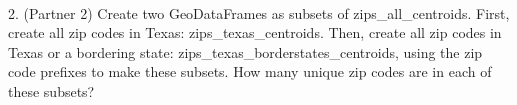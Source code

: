 \documentclass[
  letterpaper,
  DIV=11,
  numbers=noendperiod]{scrartcl}
\makeatletter
\let\oldparagraph\paragraph
\renewcommand{\paragraph}{
    \@ifstar
      \xxxParagraphStar
      \xxxParagraphNoStar
  }
\newcommand{\xxxParagraphStar}[1]{\oldparagraph*{#1}\mbox{}}
\newcommand{\xxxParagraphNoStar}[1]{\oldparagraph{#1}\mbox{}}
\makeatother
\begin{document}
\paragraph{2. (Partner 2) Create two GeoDataFrames as subsets of
zips\_all\_centroids. First, create all zip codes in Texas:
zips\_texas\_centroids. Then, create all zip codes in Texas or a
bordering state: zips\_texas\_borderstates\_centroids, using the zip
code prefixes to make these subsets. How many unique zip codes are in
each of these
subsets?}\label{partner-2-create-two-geodataframes-as-subsets-of-zips_all_centroids.-first-create-all-zip-codes-in-texas-zips_texas_centroids.-then-create-all-zip-codes-in-texas-or-a-bordering-state-zips_texas_borderstates_centroids-using-the-zip-code-prefixes-to-make-these-subsets.-how-many-unique-zip-codes-are-in-each-of-these-subsets}
\end{document}
